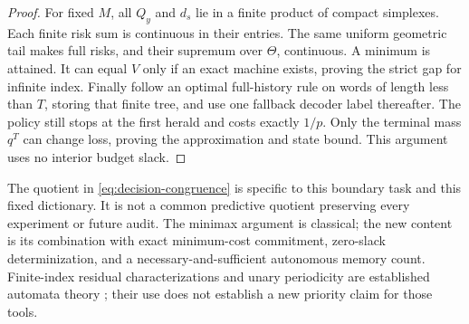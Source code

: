 \begin{proof}
For fixed $M$, all $Q_y$ and $d_s$ lie in a finite product of compact simplexes. Each finite risk sum is continuous in their entries. The same uniform geometric tail makes full risks, and their supremum over $\Theta$, continuous. A minimum is attained. It can equal $V$ only if an exact machine exists, proving the strict gap for infinite index. Finally follow an optimal full-history rule on words of length less than $T$, storing that finite tree, and use one fallback decoder label thereafter. The policy still stops at the first herald and costs exactly $1/p$. Only the terminal mass $q^T$ can change loss, proving the approximation and state bound. This argument uses no interior budget slack.
\end{proof}

The quotient in \eqref{eq:decision-congruence} is specific to this boundary task and this fixed dictionary. It is not a common predictive quotient preserving every experiment or future audit. The minimax argument is classical; the new content is its combination with exact minimum-cost commitment, zero-slack determinization, and a necessary-and-sufficient autonomous memory count. Finite-index residual characterizations and unary periodicity are established automata theory \cite{Mereghetti24}; their use does not establish a new priority claim for those tools.

